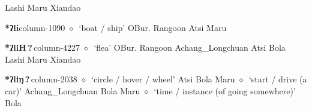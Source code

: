          Lashi 
\hspace{1ex}
         Maru 
\hspace{1ex}
         Xiandao 
  \item {\footnotesize \textbf{*ʔli}}{\tiny column-1090}
         $\diamond$~`boat / ship'
         OBur. 
\hspace{1ex}
         Rangoon 
\hspace{1ex}
         Atsi 
\hspace{1ex}
         Maru 
  \item {\footnotesize \textbf{*ʔliH\,?\,}}{\tiny column-4227}
         $\diamond$~`flea'
         OBur. 
\hspace{1ex}
         Rangoon 
\hspace{1ex}
         Achang\_Longchuan 
\hspace{1ex}
         Atsi 
\hspace{1ex}
         Bola 
\hspace{1ex}
         Lashi 
\hspace{1ex}
         Maru 
\hspace{1ex}
         Xiandao 
  \item {\footnotesize \textbf{*ʔliŋ\,?\,}}{\tiny column-2038}
         $\diamond$~`circle / hover / wheel'
         Atsi 
\hspace{1ex}
         Bola 
\hspace{1ex}
         Maru 
\hspace{1ex}
         $\diamond$~`start / drive (a car)'
         Achang\_Longchuan 
\hspace{1ex}
         Bola 
\hspace{1ex}
         Maru 
\hspace{1ex}
         $\diamond$~`time / instance (of going somewhere)'
         Bola 
\hspace{1ex}

